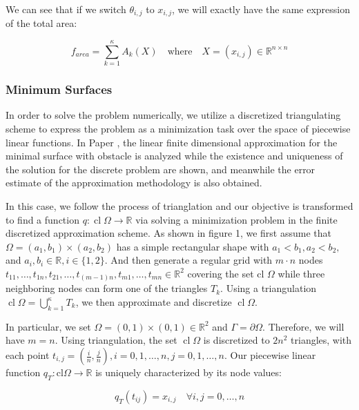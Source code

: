 We can see that if we switch $\theta_{i,j}$ to $x_{i,j}$, we will exactly have the same expression of the total area:

\begin{equation}
    f_{area} = \sum\limits^{\kappa}_{k=1}A_{k}(X) \quad \text{where} \quad X=\left(x_{i, j}\right) \in \mathbb{R}^{n \times n}
\end{equation}


\subsubsection{Minimum Surfaces}
In order to solve the problem numerically, we utilize a discretized triangulating scheme to express the problem as a minimization task over the space of piecewise linear functions. In Paper \cite{shen1992finite}, the linear finite dimensional approximation for the minimal surface with obstacle is analyzed while the existence and uniqueness of the solution for the discrete problem are shown, and meanwhile the error estimate of the approximation methodology is also obtained. 

In this case, we follow the process of trianglation and our objective is transformed to find a function  $q: \operatorname{cl} \Omega \rightarrow \mathbb{R}$ via solving a minimization problem in the finite discretized approximation scheme. As shown in figure 1, we first assume that $\Omega=\left(a_{1}, b_{1}\right) \times\left(a_{2}, b_{2}\right)$ has a simple rectangular shape with $a_{1}<b_{1}, a_{2}<b_{2},$ and $a_{i}, b_{i} \in \mathbb{R}, i \in\{1,2\} .$ And then generate a regular grid with $m \cdot n$ nodes $t_{11}, \ldots, t_{1 n}, t_{21}, \ldots, t_{(m-1) n}, t_{m 1}, \ldots, t_{m n} \in \mathbb{R}^{2}$
covering the set cl $\Omega$ while three neighboring nodes can form one of the triangles $T_{k} .$ Using a triangulation $\operatorname{cl} \Omega=\bigcup_{k=1}^{\kappa} T_{k}$, we then approximate and discretize $\operatorname{cl} \Omega$.



In particular, we set $\Omega=(0,1) \times(0,1) \in \mathbb R^{2}$ and $\Gamma=\partial \Omega$. Therefore, we will have $m=n$. Using triangulation, the set $\operatorname{cl} \Omega$ is discretized to $2 n^{2}$ triangles, with each point $t_{i, j}=\left(\frac{i}{n}, \frac{j}{n}\right), i=0,1, \ldots, n, j=0,1, \ldots, n .$ Our piecewise linear function $q_{T}: \mathrm{cl} \Omega \rightarrow \mathbb{R}$ is uniquely characterized by its node values:

\begin{equation}
    q_{T}\left(t_{i j}\right)=x_{i, j} \quad \forall i, j=0, \ldots, n
\end{equation}

